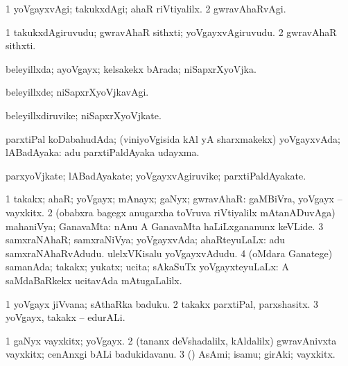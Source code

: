 {{{{{{\begin{center}
{\bentry
{} 
\gl{\kirxvi}
\expl{}
\bmng
\bnum
\num{1} yoVgayxvAgi; takukxdAgi; ahaR riVtiyalilx. 
\num{2} gwravAhaRvAgi. 
\enum
\emng
\eentry

\bentry
{} 
\gl{\nA}
\expl{}
\bmng
\bnum
\num{1} takukxdAgiruvudu; gwravAhaR sithxti; yoVgayxvAgiruvudu. 
\num{2} gwravAhaR sithxti. 
\enum
\emng
\eentry

\bentry
{} 
\gl{\gu}
\expl{}
\bmng
beleyillxda; ayoVgayx; kelsakekx bArada; niSapxrXyoVjka. 
\emng
\eentry

\bentry
{} 
\gl{\kirxvi}
\expl{}
\bmng
beleyillxde; niSapxrXyoVjkavAgi. 
\emng
\eentry

\bentry
{} 
\gl{\nA}
\expl{}
\bmng
beleyillxdiruvike; niSapxrXyoVjkate. 
\emng
\eentry

\bentry
{} 
\gl{\gu}
\expl{}
\bmng
parxtiPal koDabahudAda; (viniyoVgisida kAl yA sharxmakekx) yoVgayxvAda; lABadAyaka:  adu parxtiPaldAyaka udayxma. 
\emng
\eentry

\bentry
{} 
\gl{\nA}
\expl{}
\bmng
parxyoVjkate; lABadAyakate; yoVgayxvAgiruvike; parxtiPaldAyakate. 
\emng
\eentry

\bentry
{} 
\gl{\gu}
\bmng
\bnum
\num{1} takakx; ahaR; yoVgayx; mAnayx; gaNyx; gwravAhaR:  gaMBiVra, yoVgayx -- vayxkitx. 
\num{2} (obabxra bagegx anugarxha toVruva riVtiyalilx mAtanADuvAga) mahaniVya; GanavaMta:  nAnu A GanavaMta haLiLxgananunx keVLide. 
\num{3} samxraNAhaR; samxraNiVya; yoVgayxvAda; ahaRteyuLaLx:  adu samxraNAhaRvAdudu.  ulelxVKisalu yoVgayxvAdudu. 
\num{4} (oMdara Ganatege) samanAda; takakx; yukatx; ucita; sAkaSuTx yoVgayxteyuLaLx:  A saMdaBaRkekx ucitavAda mAtugaLalilx. 
\enum
\emng

\noindent
\gl{\pagu}
\expl{}
\bmng
\bnum
\num{1}  yoVgayx jiVvana; sAthaRka baduku. 
\num{2}  takakx parxtiPal, parxshasitx. 
\num{3}  yoVgayx, takakx -- edurALi. 
\enum
\emng
\eentry

\bentry
{} 
\gl{\nA}
\bmng
\bnum
\num{1} gaNyx vayxkitx; yoVgayx. 
\num{2} (tananx deVshadalilx, kAldalilx) gwravAnivxta vayxkitx; cenAnxgi bALi badukidavanu. 
\num{3} (\hA) AsAmi; isamu; girAki; vayxkitx. 
\enum
\emng
\eentry

}
\end{center}}}}}}}
